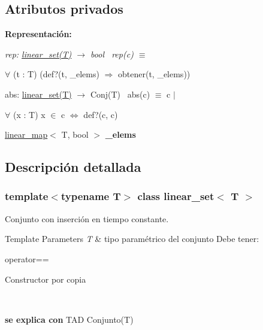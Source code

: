 \subsection*{Atributos privados}
\begin{Indent}\textbf{ Representación\+:}\par
{\em rep\+: \mbox{\hyperlink{classlinear__set}{linear\+\_\+set(\+T)}} $\to$ bool~\newline
rep(c) $\equiv$
\begin{DoxyItemize}
\item $\forall$ (t \+: T) (def?(t, \+\_\+elems) $\Rightarrow$ obtener(t, \+\_\+elems))
\end{DoxyItemize}

abs\+: \mbox{\hyperlink{classlinear__set}{linear\+\_\+set(\+T)}} $\to$ Conj(\+T)~\newline
abs(c) $\equiv$ c\textquotesingle{} $|$
\begin{DoxyItemize}
\item $\forall$ (x \+: T) x $\in$ c\textquotesingle{} $\Leftrightarrow$ def?(c, c) 
\end{DoxyItemize}}\begin{DoxyCompactItemize}
\item 
\mbox{\label{classlinear__set_ab9ee1d2a9a2b2786152f68bd0039d201}} 
\mbox{\hyperlink{classlinear__map}{linear\+\_\+map}}$<$ T, bool $>$ {\bfseries \+\_\+elems}
\end{DoxyCompactItemize}
\end{Indent}


\subsection{Descripción detallada}
\subsubsection*{template$<$typename T$>$\newline
class linear\+\_\+set$<$ T $>$}

Conjunto con inserción en tiempo constante. 


\begin{DoxyTemplParams}{Template Parameters}
{\em T} & tipo paramétrico del conjunto Debe tener\+:
\begin{DoxyItemize}
\item operator==
\item Constructor por copia
\end{DoxyItemize}\\
\hline
\end{DoxyTemplParams}
{\bfseries se explica con} T\+AD Conjunto(\+T) 

